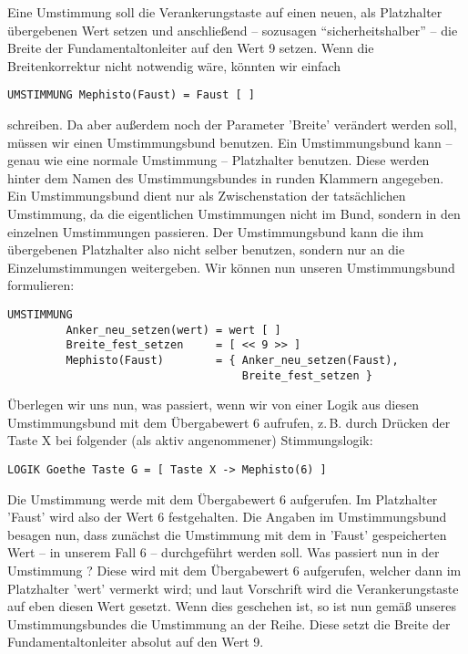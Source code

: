 Eine Umstimmung soll die Verankerungstaste auf einen neuen, als Platzhalter 
übergebenen Wert setzen und anschließend -- sozusagen 
"`sicherheitshalber"' -- die Breite der Fundamentaltonleiter auf den Wert 9 
setzen. Wenn die Breitenkorrektur nicht notwendig wäre, könnten wir einfach
\begin{verbatim}
UMSTIMMUNG Mephisto(Faust) = Faust [ ]
\end{verbatim}
schreiben. Da aber außerdem noch der Parameter 'Breite' verändert werden 
soll, müssen wir einen Umstimmungsbund benutzen. Ein Umstimmungsbund kann 
-- genau wie eine normale Umstimmung -- Platzhalter benutzen. Diese werden 
hinter dem Namen des Umstimmungsbundes in runden Klammern angegeben. 
Ein Umstimmungsbund dient nur als Zwischenstation der tatsächlichen 
Umstimmung, da die eigentlichen Umstimmungen nicht im Bund, sondern in den 
einzelnen Umstimmungen passieren. Der Umstimmungsbund kann die ihm 
übergebenen Platzhalter also nicht selber benutzen, sondern nur an die 
Einzelumstimmungen weitergeben. Wir können nun unseren Umstimmungsbund 
formulieren:
\begin{verbatim}
UMSTIMMUNG
         Anker_neu_setzen(wert) = wert [ ]
         Breite_fest_setzen     = [ << 9 >> ]
         Mephisto(Faust)        = { Anker_neu_setzen(Faust),
                                    Breite_fest_setzen }
\end{verbatim}
Überlegen wir uns nun, was passiert, wenn wir von einer Logik aus 
diesen Umstimmungsbund mit dem Übergabewert 6 aufrufen, z.\,B. durch 
Drücken der Taste X bei folgender (als aktiv angenommener) Stimmungslogik:
\begin{verbatim}
LOGIK Goethe Taste G = [ Taste X -> Mephisto(6) ]
\end{verbatim}
Die Umstimmung  werde mit dem 
Übergabewert 6 aufgerufen. Im 
Platzhalter 'Faust' wird also der Wert 6 festgehalten. 
Die Angaben im Umstimmungsbund besagen nun, dass zunächst die Umstimmung 
 mit dem in 'Faust' gespeicherten Wert -- in 
unserem Fall 6 -- durchgeführt werden soll. Was passiert nun 
in der Umstimmung  ? Diese wird mit dem 
Übergabewert 6 aufgerufen, 
welcher dann im Platzhalter 'wert' vermerkt wird; 
und laut Vorschrift wird die Verankerungstaste auf eben diesen Wert gesetzt. 
Wenn dies geschehen ist, so ist nun gemäß unseres Umstimmungsbundes die 
Umstimmung  an der Reihe. Diese setzt 
die Breite der Fundamentaltonleiter absolut auf den Wert 9.

